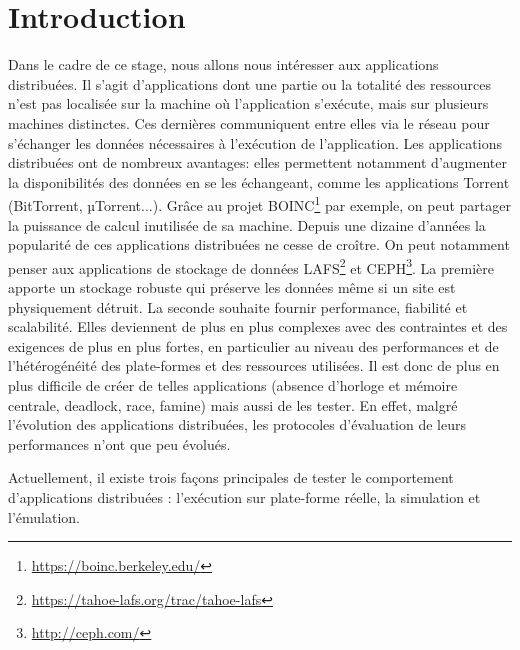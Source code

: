 \section{Introduction}



Dans le cadre de ce stage, nous allons nous intéresser aux applications
distribuées. Il s'agit d'applications dont une partie ou la totalité des
ressources n'est pas localisée sur la machine où l'application s'exécute, mais
sur plusieurs machines distinctes. Ces dernières communiquent entre elles via le
réseau pour s'échanger les données nécessaires à l'exécution de
l'application. Les applications distribuées ont de nombreux avantages: elles
permettent notamment d'augmenter la disponibilités des données en se les
échangeant, comme les applications Torrent (BitTorrent, $µ$Torrent...). Grâce au
projet BOINC\footnote{\url{https://boinc.berkeley.edu/}} par exemple, on peut
partager la puissance de calcul inutilisée de sa machine. Depuis une dizaine
d'années la popularité de ces applications distribuées ne cesse de croître. On
peut notamment penser aux applications de stockage de données
LAFS\footnote{\url{https://tahoe-lafs.org/trac/tahoe-lafs}} et
CEPH\footnote{\url{http://ceph.com/}}. La première apporte un stockage robuste
qui préserve les données même si un site est physiquement détruit. La seconde
souhaite fournir performance, fiabilité et scalabilité.  Elles deviennent de
plus en plus complexes avec des contraintes et des exigences de plus en plus
fortes, en particulier au niveau des performances et de l'hétérogénéité des
plate-formes et des ressources utilisées. Il est donc de plus en plus
difficile de créer de telles applications (absence d'horloge et mémoire
centrale, deadlock, race, famine) mais aussi de les tester.  En effet, malgré
l'évolution des applications distribuées, les protocoles d'évaluation de leurs
performances n'ont que peu évolués.
\newline

Actuellement, il existe trois façons principales de tester le comportement
d'applications distribuées \citep{gustedt2009experimental}: l'exécution sur
plate-forme réelle, la simulation et l'émulation.

